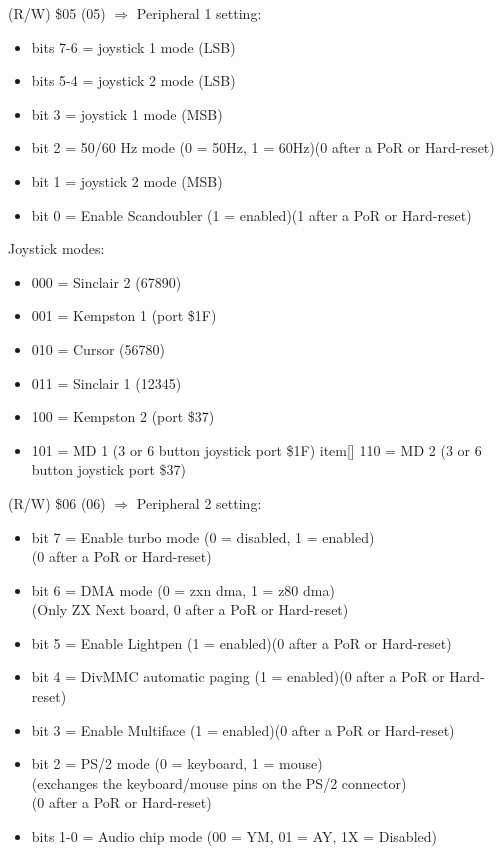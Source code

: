 (R/W) \$05 (05) $\Rightarrow$ Peripheral 1 setting:
\begin{itemize}
\item[] bits 7-6 = joystick 1 mode (LSB)
\item[] bits 5-4 = joystick 2 mode (LSB)
\item[] bit 3 = joystick 1 mode (MSB)
\item[] bit 2 = 50/60 Hz mode (0 = 50Hz, 1 = 60Hz)(0 after a PoR or Hard-reset)
\item[] bit 1 = joystick 2 mode (MSB)
\item[] bit 0 = Enable Scandoubler (1 = enabled)(1 after a PoR or Hard-reset)
\end{itemize}
Joystick modes:
\begin{itemize}
\item[] 000 = Sinclair 2 (67890)
\item[] 001 = Kempston 1 (port \$1F)
\item[] 010 = Cursor (56780)
\item[] 011 = Sinclair 1 (12345)
\item[] 100 = Kempston 2 (port \$37)
\item[] 101 = MD 1 (3 or 6 button joystick port \$1F)
item[] 110 = MD 2 (3 or 6 button joystick port \$37)
\end{itemize}

(R/W) \$06 (06) $\Rightarrow$ Peripheral 2 setting:
\begin{itemize}
\item[] bit 7 = Enable turbo mode (0 = disabled, 1 = enabled)\\
  (0 after a PoR or Hard-reset)
\item[] bit 6 = DMA mode (0 = zxn dma, 1 = z80 dma)\\
  (Only ZX Next board, 0 after a PoR or Hard-reset)
\item[] bit 5 = Enable Lightpen (1 = enabled)(0 after a PoR or Hard-reset)
\item[] bit 4 = DivMMC automatic paging (1 = enabled)(0 after a PoR or
  Hard-reset)
\item[] bit 3 = Enable Multiface (1 = enabled)(0 after a PoR or Hard-reset)
\item[] bit 2 = PS/2 mode (0 = keyboard, 1 = mouse)\\
  (exchanges the keyboard/mouse pins on the PS/2 connector)\\
  (0 after a PoR or Hard-reset)
\item[] bits 1-0 = Audio chip mode (00 = YM, 01 = AY, 1X = Disabled)
\end{itemize}

